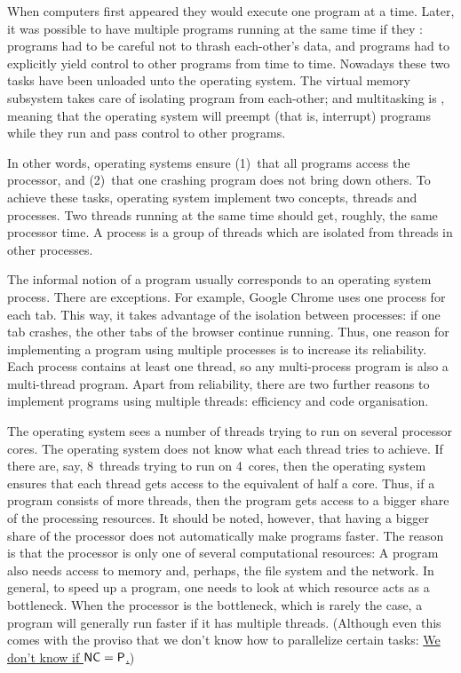 


\noindent
When computers first appeared they would execute one program at a time.
Later,
  it was possible to have multiple programs running at the same time
  if they :
programs had to be careful not to thrash each-other's data,
and programs had to explicitly yield control to other programs from time to time.
Nowadays these two tasks have been unloaded unto the operating system.
The virtual memory subsystem takes care of isolating program from each-other;
and multitasking is ,
  meaning that the operating system will preempt (that is, interrupt)
  programs while they run and pass control to other programs.

In other words, operating systems ensure
  (1)~that all programs access the processor, and
  (2)~that one crashing program does not bring down others.
To achieve these tasks, operating system implement two concepts,
  threads and processes.
Two threads running at the same time should get, roughly, the same processor time.
A process is a group of threads which are isolated from threads in other processes.

The informal notion of a program usually corresponds to an operating system process.
There are exceptions.
For example, Google Chrome uses one process for each tab.
This way,
  it takes advantage of the isolation between processes:
  if one tab crashes, the other tabs of the browser continue running.
Thus, one reason for implementing a program using multiple processes
  is to increase its reliability.
Each process contains at least one thread,
  so any multi-process program is also a multi-thread program.
Apart from reliability, there are two further reasons to implement programs
  using multiple threads: efficiency and code organisation.

The operating system sees a number of threads trying to run on several processor cores.
The operating system does not know what each thread tries to achieve.
If there are, say, 8~threads trying to run on 4~cores,
  then the operating system ensures that each thread gets access
    to the equivalent of half a core.
Thus, if a program consists of more threads,
  then the program gets access to a bigger share of the processing resources.
It should be noted, however,
  that having a bigger share of the processor
    does not automatically make programs faster.
The reason is that the processor is only one of several computational resources:
A program also needs access to memory and, perhaps, the file system and the network.
In general, to speed up a program,
  one needs to look at which resource acts as a bottleneck.
When the processor is the bottleneck, which is rarely the case,
  a program will generally run faster if it has multiple threads.
(Although even this comes with the proviso that
  we don't know how to parallelize certain tasks:
\href{https://en.wikipedia.org/wiki/NC_(complexity)}%
  {We don't know if ${\sf NC}={\sf P}$.})

